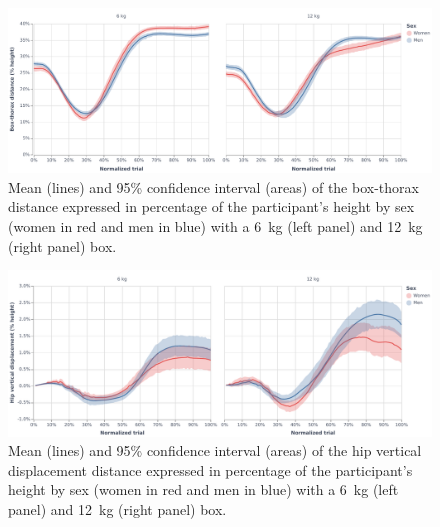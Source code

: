 \begin{figure}[H]
    \centering\includegraphics[width=1\linewidth]{fig/box-thorax.pdf}
    \caption{Mean (lines) and 95\% confidence interval (areas) of the box-thorax distance expressed in percentage of the participant's height by sex (women in red and men in blue) with a 6~kg (left panel) and 12~kg (right panel) box.}
\end{figure}

\begin{figure}[H]
    \centering\includegraphics[width=1\linewidth]{fig/hip-displacement.pdf}
    \caption{Mean (lines) and 95\% confidence interval (areas) of the hip vertical displacement distance expressed in percentage of the participant's height by sex (women in red and men in blue) with a 6~kg (left panel) and 12~kg (right panel) box.}
\end{figure}


